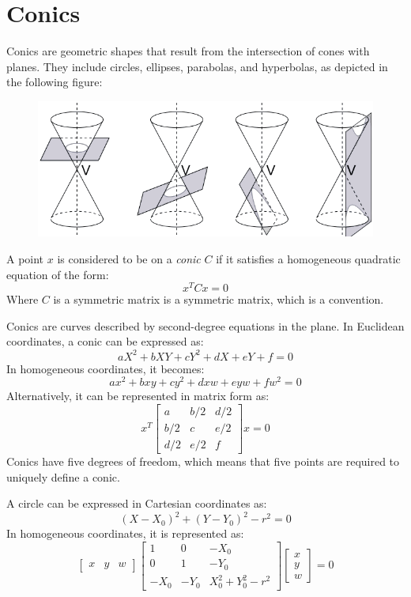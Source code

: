 \section{Conics}

Conics are geometric shapes that result from the intersection of cones with planes. 
They include circles, ellipses, parabolas, and hyperbolas, as depicted in the following figure:
\begin{figure}[H]
    \centering
    \includegraphics[width=0.5\linewidth]{images/conics.png}
\end{figure}
\begin{definition}
    A point $x$ is considered to be on a \emph{conic} $C$ if it satisfies a homogeneous quadratic equation of the form:
    \[x^TCx=0\]
    Where $C$ is a symmetric matrix is a symmetric matrix, which is a convention.
\end{definition}
Conics are curves described by second-degree equations in the plane. 
In Euclidean coordinates, a conic can be expressed as:
\[aX^2+bXY+cY^2+dX+eY+f=0\]
In homogeneous coordinates, it becomes:
\[ax^2+bxy+cy^2+dxw+eyw+fw^2=0\]
Alternatively, it can be represented in matrix form as:
\[x^T \begin{bmatrix} a & b/2 & d/2 \\ b/2 & c & e/2 \\ d/2 & e/2 & f \end{bmatrix} x=0\]
Conics have five degrees of freedom, which means that five points are required to uniquely define a conic.
\begin{example}
    A circle can be expressed in Cartesian coordinates as:
    \[(X-X_0)^2+(Y-Y_0)^2-r^2=0\]
    In homogeneous coordinates, it is represented as:
    \[  \begin{bmatrix} x & y & w \end{bmatrix}
        \begin{bmatrix} 1 & 0 & -X_0 \\ 0 & 1 & -Y_0 \\ -X_0 & -Y_0 & X_0^2+Y_0^2-r^2 \end{bmatrix}
        \begin{bmatrix} x \\ y \\ w \end{bmatrix} = 0
    \]
\end{example}

